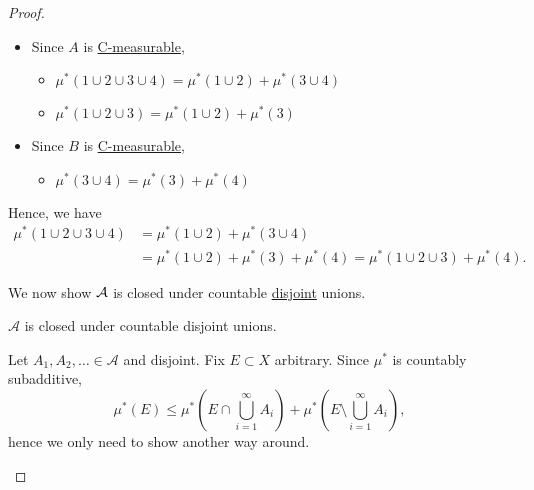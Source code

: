 \begin{proof}
\begin{enumerate}[(1)]
\begin{itemize}
\begin{explanation}
				            \begin{itemize}
					            \item Since \(A\) is \hyperref[def:C-measurable]{C-measurable},
					                  \begin{itemize}
						                  \item \(\mu^{*} (1\cup 2\cup 3\cup 4) = \mu^{*} (1\cup 2) + \mu^{*} (3\cup 4)\)
						                  \item \(\mu^{*} (1\cup 2\cup 3) = \mu^{*} (1\cup 2) + \mu^{*} (3)\)
					                  \end{itemize}
					            \item Since \(B\) is \hyperref[def:C-measurable]{C-measurable},
					                  \begin{itemize}
						                  \item \(\mu^{*} (3\cup 4) = \mu^{*} (3) + \mu^{*} (4)\)
					                  \end{itemize}
				            \end{itemize}
				            Hence, we have
				            \[
					            \begin{split}
						            \mu^{*} (1\cup 2\cup 3\cup 4) &= \mu^{*} (1\cup 2)+\mu^{*} (3\cup 4)\\
						            &= \mu^{*} (1\cup 2) + \mu^{*} (3) + \mu^{*} (4)
						            = \mu^{*}(1\cup 2\cup 3) + \mu^{*} (4).
					            \end{split}
				            \]
			            \end{explanation}
			            We now show \(\mathcal{\MakeUppercase{a}} \) is closed under countable \underline{disjoint} unions.
			            \begin{claim}
				            \(\mathcal{A} \) is closed under countable disjoint unions.
			            \end{claim}
			            \begin{explanation}
				            Let \(A_1, A_2, \ldots \in\mathcal{A}\) and disjoint.
				            Fix \(E\subset X\) arbitrary. Since \(\mu^{*} \) is countably subadditive,
				            \[
					            \mu^{*} (E) \leq  \mu^{*} \left(E\cap \bigcup\limits_{i=1}^{\infty} A_{i}\right) + \mu^{*} \left(E\setminus \bigcup\limits_{i=1}^{\infty} A_{i}\right),
				            \]
				            hence we only need to show another way around.


\end{explanation}
\end{itemize}
\end{enumerate}
\end{proof}
